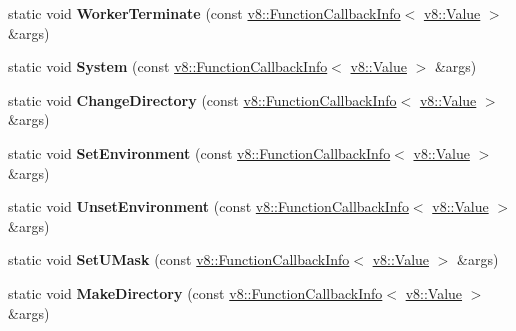 \begin{DoxyCompactItemize}
\item 
static void {\bfseries Worker\+Terminate} (const \hyperlink{classv8_1_1_function_callback_info}{v8\+::\+Function\+Callback\+Info}$<$ \hyperlink{classv8_1_1_value}{v8\+::\+Value} $>$ \&args)\hypertarget{classv8_1_1_shell_aec3f8248244ba8b07d56446236272b20}{}\label{classv8_1_1_shell_aec3f8248244ba8b07d56446236272b20}

\item 
static void {\bfseries System} (const \hyperlink{classv8_1_1_function_callback_info}{v8\+::\+Function\+Callback\+Info}$<$ \hyperlink{classv8_1_1_value}{v8\+::\+Value} $>$ \&args)\hypertarget{classv8_1_1_shell_ae09de0795a893adba7512629563cc340}{}\label{classv8_1_1_shell_ae09de0795a893adba7512629563cc340}

\item 
static void {\bfseries Change\+Directory} (const \hyperlink{classv8_1_1_function_callback_info}{v8\+::\+Function\+Callback\+Info}$<$ \hyperlink{classv8_1_1_value}{v8\+::\+Value} $>$ \&args)\hypertarget{classv8_1_1_shell_aa08a16a91023b749f2d9e0956c8200e1}{}\label{classv8_1_1_shell_aa08a16a91023b749f2d9e0956c8200e1}

\item 
static void {\bfseries Set\+Environment} (const \hyperlink{classv8_1_1_function_callback_info}{v8\+::\+Function\+Callback\+Info}$<$ \hyperlink{classv8_1_1_value}{v8\+::\+Value} $>$ \&args)\hypertarget{classv8_1_1_shell_a0977b415540cff06625e711b5d3e2625}{}\label{classv8_1_1_shell_a0977b415540cff06625e711b5d3e2625}

\item 
static void {\bfseries Unset\+Environment} (const \hyperlink{classv8_1_1_function_callback_info}{v8\+::\+Function\+Callback\+Info}$<$ \hyperlink{classv8_1_1_value}{v8\+::\+Value} $>$ \&args)\hypertarget{classv8_1_1_shell_ae7ac04fd17a20acf9fb66812b611170e}{}\label{classv8_1_1_shell_ae7ac04fd17a20acf9fb66812b611170e}

\item 
static void {\bfseries Set\+U\+Mask} (const \hyperlink{classv8_1_1_function_callback_info}{v8\+::\+Function\+Callback\+Info}$<$ \hyperlink{classv8_1_1_value}{v8\+::\+Value} $>$ \&args)\hypertarget{classv8_1_1_shell_af3f66a1cd6b81cd69e43e9453092b50f}{}\label{classv8_1_1_shell_af3f66a1cd6b81cd69e43e9453092b50f}

\item 
static void {\bfseries Make\+Directory} (const \hyperlink{classv8_1_1_function_callback_info}{v8\+::\+Function\+Callback\+Info}$<$ \hyperlink{classv8_1_1_value}{v8\+::\+Value} $>$ \&args)\hypertarget{classv8_1_1_shell_a739dd021cf5875fe3b5372d4db31dbc3}{}\label{classv8_1_1_shell_a739dd021cf5875fe3b5372d4db31dbc3}


\end{DoxyCompactItemize}
